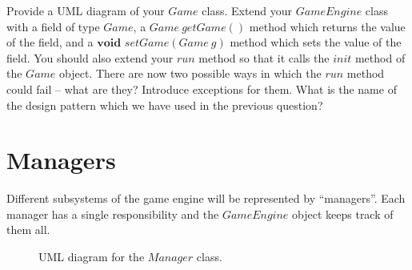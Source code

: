 \documentclass[10pt,a4paper,fleqn]{exam}
\begin{document}
\begin{questions}
\question Provide a UML diagram of your $\mathit{Game}$ class.
\question Extend your $\mathit{GameEngine}$ class with a field of type $\mathit{Game}$, a $\mathit{Game}~\mathit{getGame()}$ method which returns the value of the field, and a $\mathbf{void}$ $\mathit{setGame(Game~g)}$ method which sets the value of the field. You should also extend your $\mathit{run}$ method so that it calls the $\mathit{init}$ method of the $\mathit{Game}$ object. There are now two possible ways in which the $\mathit{run}$ method could fail -- what are they? Introduce exceptions for them.
\question What is the name of the design pattern which we have used in the previous question?

\section{Managers}

\question Different subsystems of the game engine will be represented by ``managers''. Each manager has a single responsibility and the $\mathit{GameEngine}$ object keeps track of them all.
\begin{figure}[h]
\begin{center}
\end{center}
\caption{UML diagram for the $\mathit{Manager}$ class.} \label{fig:manager}
\end{figure}
\end{questions}
\end{document}
